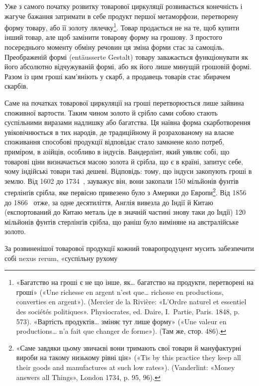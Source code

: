 Уже з самого початку розвитку товарової циркуляції розвивається
конечність і жагуче бажання затримати в себе продукт
першої метаморфози, перетворену форму товару, або її золоту
лялечку\footnote{
«Багатство на гроші є не що інше, як\dots{} багатство на продукти,
перетворені на гроші» («Une richesse en argent n’est que\dots{} richesse en
productions, converties en argent»). (Mercier de la Rivière: «L’Ordre naturel
et essentiel des sociétés politiques». Physiocrates, ed. Daire, I.~Partie, Paris.
1848, p. 573). «Вартість продуктів\dots{} зміняє тут лише форму» («Une valeur
en productions\dots{} n’a fait que changer de forme»). (Там же, стор. 486).
}. Товар продається не на те, щоб купити інший товар,
але щоб замінити товарову форму на грошову. З простого посереднього
моменту обміну речовин ця зміна форми стає за самоціль.
Преображеній формі (entäusserte Gestalt) товару заважається
функціонувати як його абсолютно відчужуваній формі,
або як його лише минущій грошовій формі. Разом із цим гроші
кам’яніють у скарб, а продавець товарів стає збирачем скарбів.

Саме на початках товарової циркуляції на гроші перетворюється
лише зайвина споживної вартости. Таким чином золото
й срібло сами собою стають суспільними виразами надлишку або
багатства. Ця наївна форма скарботворення увіковічнюється в
тих народів, де традиційному й розрахованому на власне споживання
способові продукції відповідає стало замкнене коло потреб,
приміром, в азійців, особливо в індусів. Вандерлінт, який уявляє
собі, що товарові ціни визначається масою золота й срібла, що
є в країні, запитує себе, чому індійські товари такі дешеві.
Відповідь: тому, що індуси закопують гроші в землю. Від 1602
до 1734~, зауважує він, вони закопали 150 мільйонів фунтів
стерлінґів срібла, яке первісно привезено було з Америки до
Европи\footnote{
«Саме завдяки цьому звичаєві вони тримають свої товари й мануфактурні
вироби на такому низькому рівні цін» («Tis by this practice
they keep all their goods and manufactures at such low rates»). (Vanderlint:
«Money answers all Things», London 1734, p. 95, 96).
}. Від 1856 до 1866~ отже, за одне десятиліття, Англія
вивезла до Індії й Китаю (експортований до Китаю металь іде в
значній частині знову таки до Індії) 120 мільйонів фунтів стерлінґів
срібла, що раніш було виміняне на австралійське золото.

За розвиненішої товарової продукції кожний товаропродуцент
мусить забезпечити собі nexus rerum, «суспільну рухому
\parbreak{}  %
